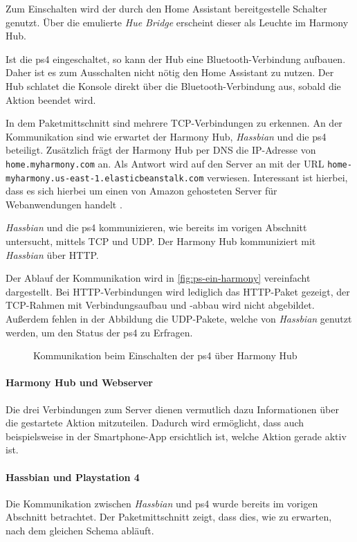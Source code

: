 Zum Einschalten wird der durch den Home Assistant bereitgestelle Schalter genutzt.
Über die emulierte \textit{Hue Bridge} erscheint dieser als Leuchte im Harmony Hub.

Ist die \ac{ps4} eingeschaltet, so kann der Hub eine Bluetooth-Verbindung aufbauen.
Daher ist es zum Ausschalten nicht nötig den Home Assistant zu nutzen.
Der Hub schlatet die Konsole direkt über die Bluetooth-Verbindung aus, sobald die Aktion beendet wird.

In dem Paketmittschnitt sind mehrere TCP-Verbindungen zu erkennen.
An der Kommunikation sind wie erwartet der Harmony Hub, \textit{Hassbian} und die \ac{ps4} beteiligt.
Zusätzlich frägt der Harmony Hub per DNS die IP-Adresse von \nolinkurl{home.myharmony.com} an.
Als Antwort wird auf den Server an mit der URL \nolinkurl{home-myharmony.us-east-1.elasticbeanstalk.com} verwiesen.
Interessant ist hierbei,
dass es sich hierbei um einen von Amazon gehosteten Server für Webanwendungen handelt \cite{AWSElast48:online}.

\textit{Hassbian} und die \ac{ps4} kommunizieren, wie bereits im vorigen Abschnitt untersucht, mittels TCP und UDP.
Der Harmony Hub kommuniziert mit \textit{Hassbian} über HTTP.

Der Ablauf der Kommunikation wird in \autoref{fig:ps-ein-harmony} vereinfacht dargestellt.
Bei HTTP-Verbindungen wird lediglich das HTTP-Paket gezeigt,
der TCP-Rahmen mit Verbindungsaufbau und -abbau wird nicht abgebildet.
Außerdem fehlen in der Abbildung die UDP-Pakete,
welche von \textit{Hassbian} genutzt werden,
um den Status der \ac{ps4} zu Erfragen.

\begin{figure}[ht!]
    \centering
    \resizebox{\textwidth}{!}{
        
    }
    \caption{Kommunikation beim Einschalten der \ac{ps4} über Harmony Hub}
    \label{fig:ps-ein-harmony}
\end{figure}

\paragraph{Harmony Hub und Webserver}
Die drei Verbindungen zum Server dienen vermutlich dazu Informationen über die gestartete Aktion mitzuteilen.
Dadurch wird ermöglicht, dass auch beispielsweise in der Smartphone-App ersichtlich ist, welche Aktion gerade aktiv ist.

\paragraph{Hassbian und Playstation 4}
Die Kommunikation zwischen \textit{Hassbian} und \ac{ps4} wurde bereits im vorigen Abschnitt betrachtet.
Der Paketmittschnitt zeigt, dass dies, wie zu erwarten, nach dem gleichen Schema abläuft.


